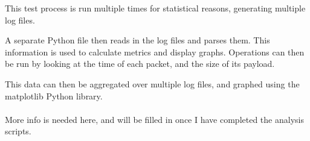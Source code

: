 \documentclass{sig-alternate-05-2015}
\begin{document}
This test process is run multiple times for statistical reasons, generating multiple log files.

\begin{center}
	\noindent{}
\end{center}

A separate Python file then reads in the log files and parses them. This information is used to calculate metrics and display graphs.
Operations can then be run by looking at the time of each packet, and the size of its payload. 

This data can then be aggregated over multiple log files, and graphed using the matplotlib Python library.
\\\\More info is needed here, and will be filled in once I have completed the analysis scripts.


 
\end{document}
